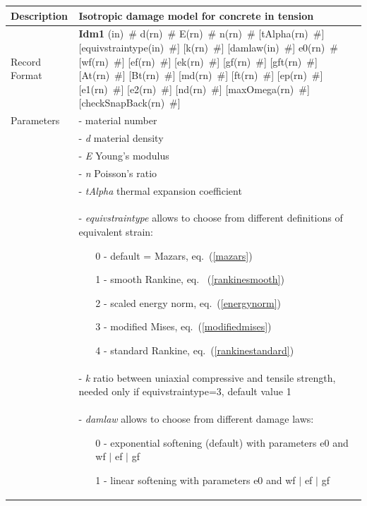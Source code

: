 \documentclass[a4paper]{article}
\newcommand{\descitem}[1]{{\noindent \bf #1}}
\newcommand{\elemparam}[2]{{{#1\tiny (#2)}~\#}}
\newcommand{\param}[1]{{\it #1}}
\begin{document}
\begin{table}[!htb]
  \small
\begin{tabular}{|l|p{9cm}|}
\hline
Description & Isotropic damage model for concrete in tension\\
\hline
Record Format & \descitem{Idm1} 
\elemparam{}{in} 
\elemparam{d}{rn} 
\elemparam{E}{rn}
\elemparam{n}{rn} 
[\elemparam{tAlpha}{rn}] 
[\elemparam{equivstraintype}{in}] 
[\elemparam{k}{rn}]
[\elemparam{damlaw}{in}] 
\elemparam{e0}{rn}
[\elemparam{wf}{rn}] 
[\elemparam{ef}{rn}]
[\elemparam{ek}{rn}]
[\elemparam{gf}{rn}]
[\elemparam{gft}{rn}]
[\elemparam{At}{rn}] 
[\elemparam{Bt}{rn}] 
[\elemparam{md}{rn}] 
[\elemparam{ft}{rn}] 
[\elemparam{ep}{rn}] 
[\elemparam{e1}{rn}] 
[\elemparam{e2}{rn}] 
[\elemparam{nd}{rn}] 
[\elemparam{maxOmega}{rn}]
[\elemparam{checkSnapBack}{rn}]\\
Parameters &- \param{} material number\\
&- \param{d} material density\\
&- \param{E} Young's modulus\\
&- \param{n} Poisson's ratio\\
&- \param{tAlpha} thermal expansion coefficient\\
&- \param{equivstraintype} allows to choose from different definitions
of equivalent strain:
\begin{itemize}\setlength{\itemsep}{-3pt}
\item[0 -] default = Mazars, eq.~(\ref{mazars})
\item[1 -] smooth Rankine, eq.~ (\ref{rankinesmooth})
\item[2 -] scaled energy norm,  eq.~(\ref{energynorm})
\item[3 -] modified Mises, eq.~(\ref{modifiedmises})
\item[4 -] standard Rankine, eq.~(\ref{rankinestandard})
\end{itemize}\\
&- \param{k} ratio between uniaxial compressive and tensile strength, needed only if equivstraintype=3, default value 1\\
&- \param{damlaw} allows to choose from different damage laws:
\begin{itemize}\setlength{\itemsep}{-3pt}
\item[0 -] exponential softening (default) with parameters e0 and wf $\vert$ ef $\vert$ gf
\item[1 -] linear softening with parameters e0 and wf $\vert$ ef $\vert$ gf

\end{itemize}
\end{tabular}
\end{table}
\end{document}
